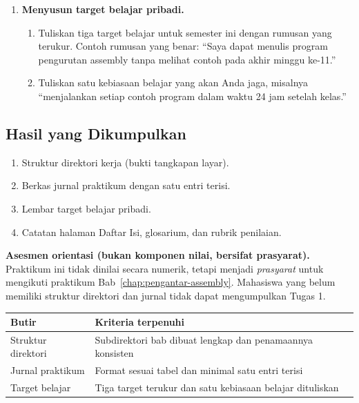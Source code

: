 \begin{enumerate}
    \item \textbf{Menyusun target belajar pribadi.}
    \begin{enumerate}
        \item Tuliskan tiga target belajar untuk semester ini dengan
              rumusan yang terukur. Contoh rumusan yang benar:
              ``Saya dapat menulis program pengurutan assembly
              tanpa melihat contoh pada akhir minggu ke-11.''
        \item Tuliskan satu kebiasaan belajar yang akan Anda jaga,
              misalnya ``menjalankan setiap contoh program dalam
              waktu 24 jam setelah kelas.''
    \end{enumerate}
\end{enumerate}

\subsection{Hasil yang Dikumpulkan}

\begin{enumerate}
    \item Struktur direktori kerja (bukti tangkapan layar).
    \item Berkas jurnal praktikum dengan satu entri terisi.
    \item Lembar target belajar pribadi.
    \item Catatan halaman Daftar Isi, glosarium, dan rubrik penilaian.
\end{enumerate}

\begin{asesmenbox}
\textbf{Asesmen orientasi (bukan komponen nilai, bersifat
prasyarat).} Praktikum ini tidak dinilai secara numerik, tetapi
menjadi \emph{prasyarat} untuk mengikuti praktikum
Bab~\ref{chap:pengantar-assembly}.
Mahasiswa yang belum memiliki struktur direktori dan jurnal tidak
dapat mengumpulkan Tugas 1.

\begin{tabular}{@{}p{7.0cm}p{6.4cm}@{}}
    \toprule
    \textbf{Butir} & \textbf{Kriteria terpenuhi} \\
    \midrule
    Struktur direktori & Subdirektori bab dibuat lengkap dan
    penamaannya konsisten \\
    \addlinespace
    Jurnal praktikum & Format sesuai tabel dan minimal satu entri
    terisi \\
    \addlinespace
    Target belajar & Tiga target terukur dan satu kebiasaan belajar
    dituliskan \\
    \bottomrule
\end{tabular}
\end{asesmenbox}
